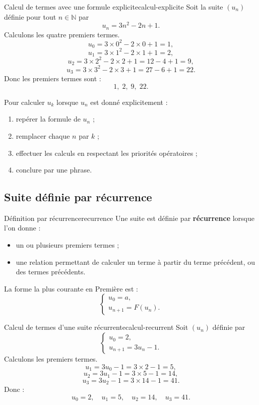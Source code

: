 \documentclass[11pt,a4paper]{article}
\newcommand{\N}{\mathbb{N}}
\begin{document}
\begin{examplebox}{Calcul de termes avec une formule explicite}{calcul-explicite}
Soit la suite $(u_n)$ définie pour tout $n\in\N$ par
\[
 u_n=3n^2-2n+1.
\]
Calculons les quatre premiers termes.
\[
 u_0=3\times 0^2-2\times 0+1=1,
\]
\[
 u_1=3\times 1^2-2\times 1+1=2,
\]
\[
 u_2=3\times 2^2-2\times 2+1=12-4+1=9,
\]
\[
 u_3=3\times 3^2-2\times 3+1=27-6+1=22.
\]
Donc les premiers termes sont :
\[
1,\;2,\;9,\;22.
\]
\end{examplebox}

\begin{methodbox}
Pour calculer $u_k$ lorsque $u_n$ est donné explicitement :
\begin{enumerate}
  \item repérer la formule de $u_n$ ;
  \item remplacer chaque $n$ par $k$ ;
  \item effectuer les calculs en respectant les priorités opératoires ;
  \item conclure par une phrase.
\end{enumerate}
\end{methodbox}

\subsection{Suite définie par récurrence}

\begin{definitionbox}{Définition par récurrence}{recurrence}
Une suite est définie par \textbf{récurrence} lorsque l'on donne :
\begin{itemize}
  \item un ou plusieurs premiers termes ;
  \item une relation permettant de calculer un terme à partir du terme précédent, ou des termes précédents.
\end{itemize}

La forme la plus courante en Première est :
\[
\begin{cases}
 u_0=a,\\
 u_{n+1}=F(u_n).
\end{cases}
\]
\end{definitionbox}

\begin{examplebox}{Calcul de termes d'une suite récurrente}{calcul-recurrent}
Soit $(u_n)$ définie par
\[
\begin{cases}
 u_0=2,\\
 u_{n+1}=3u_n-1.
\end{cases}
\]
Calculons les premiers termes.
\[
 u_1=3u_0-1=3\times 2-1=5,
\]
\[
 u_2=3u_1-1=3\times 5-1=14,
\]
\[
 u_3=3u_2-1=3\times 14-1=41.
\]
Donc :
\[
 u_0=2,\quad u_1=5,\quad u_2=14,\quad u_3=41.
\]
\end{examplebox}
\end{document}

